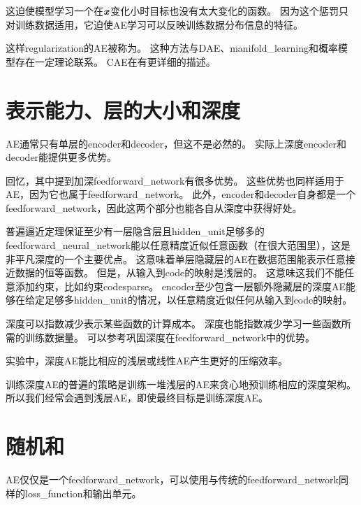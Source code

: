 这迫使模型学习一个在$\boldsymbol{\mathit{x}}$变化小时目标也没有太大变化的函数。
因为这个惩罚只对训练数据适用，它迫使\gls{AE}学习可以反映训练数据分布信息的特征。


这样\gls{regularization}的\gls{AE}被称为。
这种方法与\gls{DAE}、\gls{manifold_learning}和概率模型存在一定理论联系。
\gls{CAE}在有更详细的描述。


\section{表示能力、层的大小和深度}
\label{sec:representational_power_layer_size_and_depth}
\gls{AE}通常只有单层的\gls{encoder}和\gls{decoder}，但这不是必然的。
实际上深度\gls{encoder}和\gls{decoder}能提供更多优势。


回忆，其中提到加深\gls{feedforward_network}有很多优势。
这些优势也同样适用于\gls{AE}，因为它也属于\gls{feedforward_network}。
此外，\gls{encoder}和\gls{decoder}自身都是一个\gls{feedforward_network}，因此这两个部分也能各自从深度中获得好处。


普遍逼近定理保证至少有一层隐含层且\gls{hidden_unit}足够多的\gls{feedforward_neural_network}能以任意精度近似任意函数（在很大范围里），这是非平凡深度的一个主要优点。
这意味着单层隐藏层的\gls{AE}在数据范围能表示任意接近数据的恒等函数。
但是，从输入到\gls{code}的映射是浅层的。
这意味这我们不能任意添加约束，比如约束\gls{code}\gls{sparse}。
\gls{encoder}至少包含一层额外隐藏层的深度\gls{AE}能够在给定足够多\gls{hidden_unit}的情况，以任意精度近似任何从输入到\gls{code}的映射。


深度可以指数减少表示某些函数的计算成本。
深度也能指数减少学习一些函数所需的训练数据量。
可以参考巩固深度在\gls{feedforward_network}中的优势。


实验中，深度\gls{AE}能比相应的浅层或线性\gls{AE}产生更好的压缩效率\citep{Hinton-Science2006}。

训练深度\gls{AE}的普遍的策略是训练一堆浅层的\gls{AE}来贪心地预训练相应的深度架构。
所以我们经常会遇到浅层\gls{AE}，即使最终目标是训练深度\gls{AE}。


\section{随机和}
\label{sec:stochastic_encoders_and_decoders}
\gls{AE}仅仅是一个\gls{feedforward_network}，可以使用与传统的\gls{feedforward_network}同样的\gls{loss_function}和输出单元。


